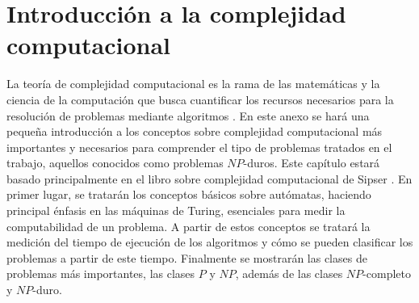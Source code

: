 \chapter{Introducción a la complejidad computacional}\label{anexoCC}
La teoría de complejidad computacional es la rama de las matemáticas y la ciencia de la computación que busca cuantificar los recursos necesarios para la resolución de problemas mediante algoritmos \cite{combarro-2023}. En este anexo se hará una pequeña introducción a los conceptos sobre complejidad computacional más importantes y necesarios para comprender el tipo de problemas tratados en el trabajo, aquellos conocidos como problemas $NP$-duros. Este capítulo estará basado principalmente en el libro sobre complejidad computacional de Sipser \cite{sipser-cc}. En primer lugar, se tratarán los conceptos básicos sobre autómatas, haciendo principal énfasis en las máquinas de Turing, esenciales para medir la computabilidad de un problema. A partir de estos conceptos se tratará la medición del tiempo de ejecución de los algoritmos y cómo se pueden clasificar los problemas a partir de este tiempo. Finalmente se mostrarán las clases de problemas más importantes, las clases $P$ y $NP$, además de las clases $NP$-completo y $NP$-duro.\\

